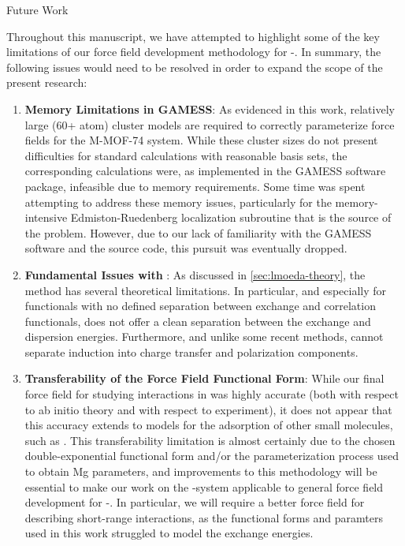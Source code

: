 \begin{section}{Future Work}
\label{sec:lmoeda-future_work}

Throughout this manuscript, we have attempted to highlight some of the key
limitations of our force field development methodology for \cus-\mofs. 
In summary, the following issues would need to be resolved in order to expand the
scope of the present research:
\begin{enumerate}
%
\item \textbf{Memory Limitations in GAMESS}: 
%
As evidenced in this work,
relatively large (60+ atom) cluster models are required to correctly
parameterize force fields for the M-MOF-74 system. While these cluster sizes
do not present difficulties for standard \dft calculations with reasonable
basis sets, the corresponding
\lmoeda calculations were, as implemented in the GAMESS software package,
infeasible due to memory requirements. Some time was spent attempting to
address these memory issues, particularly for the memory-intensive
Edmiston-Ruedenberg localization subroutine that is the source of the problem.
However, due to our lack of familiarity with the GAMESS software and the
\lmoeda source code, this pursuit was eventually dropped. 
%
\item \textbf{Fundamental Issues with \lmoeda}: 
%
As discussed in \cref{sec:lmoeda-theory}, the \lmoeda method has several
theoretical limitations. In particular, and especially for functionals with no
defined separation between exchange and correlation functionals, \lmoeda does
not offer a clean separation between the exchange and dispersion energies.
Furthermore, and unlike some recent \eda methods, \lmoeda cannot separate induction
into charge transfer and polarization components. 
%
\item \textbf{Transferability of the Force Field Functional Form}: 
%
While our
final force field for 
studying \co interactions in \mgmof was highly accurate (both with respect to
ab initio theory and with respect to experiment), it does not appear that this 
accuracy extends to models for the adsorption of other small molecules, such as
. This transferability limitation is almost certainly due to the chosen
double-exponential functional form and/or the parameterization process used to
obtain Mg parameters, and improvements to this methodology will be essential
to make our work on the \co-\mgmof system applicable to general force field
development for \cus-\mofs. In particular, we will require a better force field for describing
short-range interactions, as the functional forms and paramters used in this
work struggled to model the \mgmof exchange energies.
%
\end{enumerate}


\end{section}
